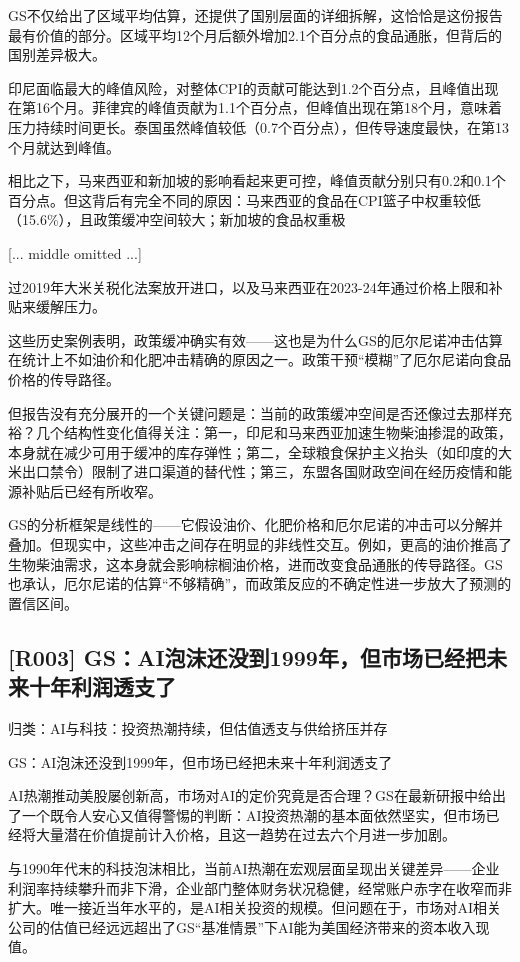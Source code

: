 \documentclass[11pt]{ctexart}
\begin{document}
GS不仅给出了区域平均估算，还提供了国别层面的详细拆解，这恰恰是这份报告最有价值的部分。区域平均12个月后额外增加2.1个百分点的食品通胀，但背后的国别差异极大。

印尼面临最大的峰值风险，对整体CPI的贡献可能达到1.2个百分点，且峰值出现在第16个月。菲律宾的峰值贡献为1.1个百分点，但峰值出现在第18个月，意味着压力持续时间更长。泰国虽然峰值较低（0.7个百分点），但传导速度最快，在第13个月就达到峰值。

相比之下，马来西亚和新加坡的影响看起来更可控，峰值贡献分别只有0.2和0.1个百分点。但这背后有完全不同的原因：马来西亚的食品在CPI篮子中权重较低（15.6\%），且政策缓冲空间较大；新加坡的食品权重极

[... middle omitted ...]

过2019年大米关税化法案放开进口，以及马来西亚在2023-24年通过价格上限和补贴来缓解压力。

这些历史案例表明，政策缓冲确实有效——这也是为什么GS的厄尔尼诺冲击估算在统计上不如油价和化肥冲击精确的原因之一。政策干预“模糊”了厄尔尼诺向食品价格的传导路径。

但报告没有充分展开的一个关键问题是：当前的政策缓冲空间是否还像过去那样充裕？几个结构性变化值得关注：第一，印尼和马来西亚加速生物柴油掺混的政策，本身就在减少可用于缓冲的库存弹性；第二，全球粮食保护主义抬头（如印度的大米出口禁令）限制了进口渠道的替代性；第三，东盟各国财政空间在经历疫情和能源补贴后已经有所收窄。

GS的分析框架是线性的——它假设油价、化肥价格和厄尔尼诺的冲击可以分解并叠加。但现实中，这些冲击之间存在明显的非线性交互。例如，更高的油价推高了生物柴油需求，这本身就会影响棕榈油价格，进而改变食品通胀的传导路径。GS也承认，厄尔尼诺的估算“不够精确”，而政策反应的不确定性进一步放大了预测的置信区间。

\subsection{[R003] GS：AI泡沫还没到1999年，但市场已经把未来十年利润透支了}
{\small\color{refgray}归类：AI与科技：投资热潮持续，但估值透支与供给挤压并存}

GS：AI泡沫还没到1999年，但市场已经把未来十年利润透支了

AI热潮推动美股屡创新高，市场对AI的定价究竟是否合理？GS在最新研报中给出了一个既令人安心又值得警惕的判断：AI投资热潮的基本面依然坚实，但市场已经将大量潜在价值提前计入价格，且这一趋势在过去六个月进一步加剧。

与1990年代末的科技泡沫相比，当前AI热潮在宏观层面呈现出关键差异——企业利润率持续攀升而非下滑，企业部门整体财务状况稳健，经常账户赤字在收窄而非扩大。唯一接近当年水平的，是AI相关投资的规模。但问题在于，市场对AI相关公司的估值已经远远超出了GS“基准情景”下AI能为美国经济带来的资本收入现值。
\end{document}
